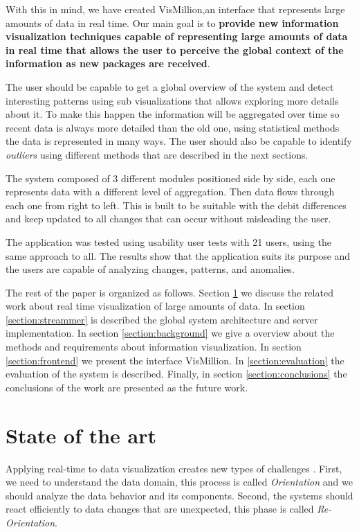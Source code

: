 \documentclass[letterpaper, 10 pt, conference]{ieeeconf}  %
\begin{document}
With this in mind, we have created VisMillion,an interface that represents large amounts of data in real time. Our main goal is to \textbf{provide new information visualization techniques capable of representing large amounts of data in real time that allows the user to perceive the global context of the information as new packages are received}.

The user should be capable to get a global overview of the system and detect interesting patterns using sub visualizations that allows exploring more details about it. To make this happen the information will be aggregated over time so recent data is always more detailed than the old one, using statistical methods the data is represented in many ways. The user should also be capable to identify \textit{outliers} using different methods that are described in the next sections.

The system composed of 3 different modules positioned side by side, each one represents data with a different level of aggregation. Then data flows through each one from right to left. This is built to be suitable with the debit differences and keep updated to all changes that can occur without misleading the user. 

The application was tested using usability user tests with 21 users, using the same approach to all. The results show that the application suits its purpose and the users are capable of analyzing changes, patterns, and anomalies.

The rest of the paper is organized as follows. Section \ref{section:stateofart} we discuss the related work about real time visualization of large amounts of data. In section \ref{section:streammer} is described the global system architecture and server implementation. In section \ref{section:background} we give a overview about the methods and requirements about information visualization. In section \ref{section:frontend} we present the interface VisMillion. In \ref{section:evaluation} the evaluation of the system is described. Finally, in section \ref{section:conclusions} the conclusions of the work are presented as the future work.




\section{State of the art}
\label{section:stateofart}
Applying real-time to data visualization creates new types of challenges \cite{7994551}. First, we need to understand the data domain, this process is called \textit{Orientation} and we should analyze the data behavior and its components. Second, the systems should react efficiently to data changes that are unexpected, this phase is called \textit{Re-Orientation}.
\end{document}
